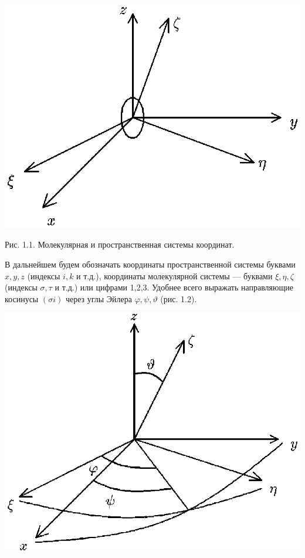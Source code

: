 \vskip 3mm
\centerline{\hbox{\includegraphics[scale=0.7]{Ris/ris_eps/ris1_01.eps}}}

\centerline{\ris Рис. 1.1. Молекулярная и
пространственная системы координат.} \vskip 1mm

В дальнейшем будем обозначать координаты пространственной системы
буквами $x,y,z$ (индексы $i,k$ и т.д.), координаты молекулярной
системы --- буквами $\xi,\eta,\zeta$ (индексы $\sigma,\tau$ и
т.д.) или цифрами 1,2,3. Удобнее всего выражать направляющие
косинусы $(\sigma i)$ через углы Эйлера $\varphi,\psi,\vartheta$
(рис. 1.2).\vskip -2mm

\vskip 3mm
\centerline{\hbox{\includegraphics[scale=0.7]{Ris/ris_eps/ris1_02.eps}}}

